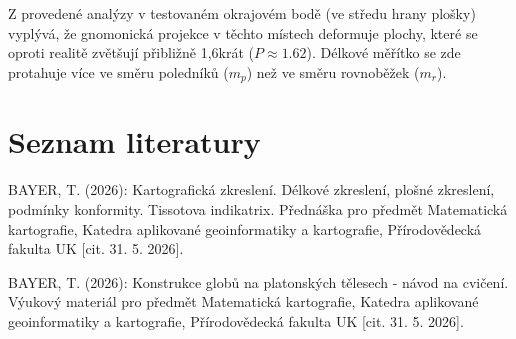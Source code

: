 \documentclass[12pt, a4paper]{article}
\begin{document}
\noindent Z provedené analýzy v testovaném okrajovém bodě (ve středu hrany plošky) vyplývá, že gnomonická projekce v těchto místech deformuje plochy, které se oproti realitě zvětšují přibližně 1,6krát ($P \approx 1.62$). Délkové měřítko se zde protahuje více ve směru poledníků ($m_p$) než ve směru rovnoběžek ($m_r$).

\newpage
\section{Seznam literatury}
\vspace{5mm}
BAYER, T. (2026): Kartografická zkreslení. Délkové zkreslení, plošné zkreslení, podmínky konformity. Tissotova indikatrix. Přednáška pro předmět Matematická kartografie, Katedra aplikované geoinformatiky a kartografie, Přírodovědecká fakulta UK [cit. 31. 5. 2026].
\vspace{3mm}

\noindent BAYER, T. (2026): Konstrukce globů na platonských tělesech - návod na cvičení. Výukový materiál pro předmět Matematická kartografie, Katedra aplikované geoinformatiky a kartografie, Přírodovědecká fakulta UK [cit. 31. 5. 2026].
\end{document}
